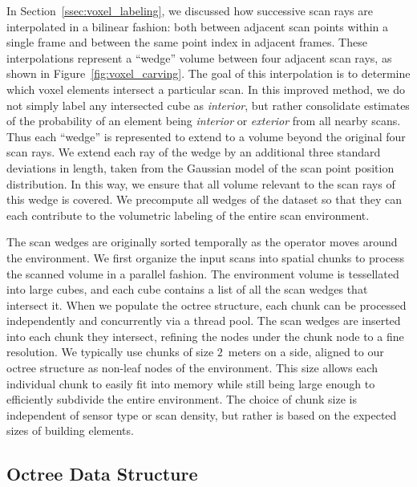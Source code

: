 \documentclass[12pt,onecolumn,oneside]{book}
\begin{document}
In Section~\ref{ssec:voxel_labeling}, we discussed how successive scan rays are interpolated in a bilinear fashion:  both between adjacent scan points within a single frame and between the same point index in adjacent frames.  These interpolations represent a ``wedge'' volume between four adjacent scan rays, as shown in Figure~\ref{fig:voxel_carving}.  The goal of this interpolation is to determine which voxel elements intersect a particular scan.  In this improved method, we do not simply label any intersected cube as {\it interior}, but rather consolidate estimates of the probability of an element being {\it interior} or {\it exterior} from all nearby scans.  Thus each ``wedge'' is represented to extend to a volume beyond the original four scan rays.  We extend each ray of the wedge by an additional three standard deviations in length, taken from the Gaussian model of the scan point position distribution.  In this way, we ensure that all volume relevant to the scan rays of this wedge is covered.  We precompute all wedges of the dataset so that they can each contribute to the volumetric labeling of the entire scan environment.

The scan wedges are originally sorted temporally as the operator moves around the environment.  We first organize the input scans into spatial chunks to process the scanned volume in a parallel fashion.  The environment volume is tessellated into large cubes, and each cube contains a list of all the scan wedges that intersect it.  When we populate the octree structure, each chunk can be processed independently and concurrently via a thread pool.  The scan wedges are inserted into each chunk they intersect, refining the nodes under the chunk node to a fine resolution.  We typically use chunks of size $2$~meters on a side, aligned to our octree structure as non-leaf nodes of the environment.  This size allows each individual chunk to easily fit into memory while still being large enough to efficiently subdivide the entire environment.  The choice of chunk size is independent of sensor type or scan density, but rather is based on the expected sizes of building elements.

\subsection{Octree Data Structure}
\label{ssec:procarve_octree}
\end{document}
